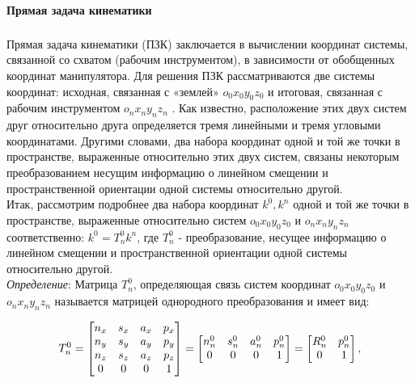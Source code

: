 \paragraph*{Прямая задача кинематики}$\phantom{-}$\\
\hspace*{\parindent} Прямая задача кинематики (ПЗК) заключается в вычислении координат системы, связанной со схватом (рабочим инструментом), в зависимости от обобщенных координат манипулятора.
Для решения ПЗК рассматриваются две системы координат: исходная, связанная с «землей» $o_0 x_0 y_0 z_0$ и итоговая, связанная с рабочим инструментом $o_n x_n y_n z_n$ . Как известно, расположение этих двух систем друг относительно друга определяется тремя линейными и тремя угловыми координатами. Другими словами, два набора координат одной и той же точки в пространстве, выраженные относительно этих двух систем, связаны некоторым преобразованием несущим информацию о линейном смещении и пространственной ориентации одной системы относительно другой.\\
\hspace*{\parindent}Итак, рассмотрим подробнее два набора координат $k^0, k^n$ одной и той же точки в пространстве, выраженные относительно систем $o_0 x_0 y_0 z_0$ и $o_n x_n y_n z_n$ соответственно:
$k^0 = T_n^0 k^n$, где $T_n^0$ - преобразование, несущее информацию о линейном смещении и пространственной ориентации одной системы относительно другой.\\
\textit{Определение}: Матрица $T_n^0$, определяющая связь систем координат $o_0 x_0 y_0 z_0$ и $o_n x_n y_n z_n$ называется матрицей однородного преобразования и имеет вид:

\begin{equation}\label{eq:model}
T_n^0=
    \begin{bmatrix}
    n_x & s_x & a_x & p_x \\
    n_y & s_y & a_y & p_y \\
    n_z & s_z & a_z & p_z \\
    0 & 0 & 0 & 1 \\
    \end{bmatrix}
    =
     \begin{bmatrix}
    n_n^0  &  s_n^0 & a_n^0 & p_n^0 \\
    0 & 0 & 0 & 1\\
    \end{bmatrix}
     =
     \begin{bmatrix}
    R_n^0  &  p_n^0 \\
     0 & 1\\
    \end{bmatrix}
    ,\\
\end{equation} 

